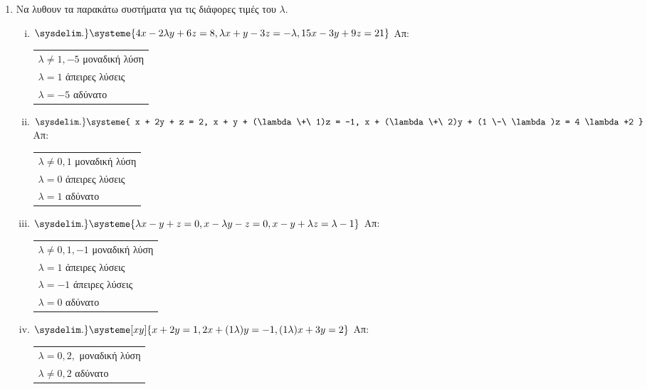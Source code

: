 \begin{enumerate}
\begin{enumerate}[i)]
 \end{enumerate}

\item Να λυθουν τα παρακάτω συστήματα για τις διάφορες τιμές του $ \lambda $.

  \begin{enumerate}[i)]
    \setlength{\itemsep}{\baselineskip}
  \item $\sysdelim.\} \systeme{4x-2\lambda y + 6z = 8, \lambda x + y -3z = -\lambda, 15x -3y + 9z = 21
  } $ \hfill Απ: \begin{tabular}{l}
    $\lambda \neq 1,-5 $ μοναδική λύση \\
    $\lambda = 1 $ άπειρες λύσεις \\
    $\lambda =-5 $ αδύνατο
  \end{tabular}


\item $ \sysdelim.\} \systeme{
  x + 2y + z = 2, 
  x + y + (\lambda  \+\ 1)z = -1, 
  x + (\lambda  \+\ 2)y + (1 \-\ \lambda)z = 4 \lambda +2
} $ \hfill Απ: \begin{tabular}{l}
  $ \lambda \neq 0, 1 $ μοναδική λύση \\
  $ \lambda = 0 $ άπειρες λύσεις \\
  $ \lambda = 1 $ αδύνατο 
\end{tabular} 

\item $ \sysdelim.\} \systeme{
  \lambda x - y + z = 0,
  x - \lambda y - z = 0, 
  x - y + \lambda z = \lambda - 1
} $ \hfill Απ: \begin{tabular}{l}
  $ \lambda \neq 0, 1, -1 $ μοναδική λύση \\
  $ \lambda = 1$ άπειρες λύσεις \\
  $ \lambda = -1 $ άπειρες λύσεις \\
  $ \lambda = 0 $ αδύνατο
\end{tabular} 

\item $ \sysdelim.\} \systeme[xy]{
  x + 2y = 1,
  2x+(1 \- \lambda)y = -1, 
  (1 \- \lambda)x + 3y = 2
} $ \hfill Απ: \begin{tabular}{l}
  $ \lambda = 0, 2, $ μοναδική λύση \\
  $ \lambda \neq 0, 2 $ αδύνατο \\
\end{tabular} 

  \end{enumerate}

\end{enumerate}


